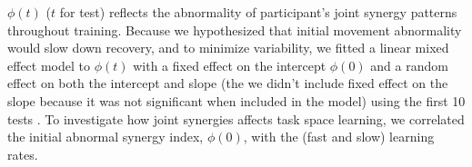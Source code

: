 $ \phi(t) $ ($ t $ for test) reflects the abnormality of participant’s joint synergy patterns throughout training. 
Because we hypothesized that initial movement abnormality would slow down recovery, and to minimize variability, we fitted a linear mixed effect model to $ \phi(t) $ with a fixed effect on the intercept $ \phi(0) $ and   a random effect on both the intercept and slope (the we didn’t include fixed effect on the slope because it was not significant when included in the model)  using the first 10 tests  . 
To investigate how joint synergies affects task space learning, we correlated the initial abnormal synergy index, $ \phi(0) $, with the (fast and slow) learning rates. 

%
%
%
%



